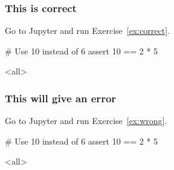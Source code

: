 \documentclass{beamerunicatt}
\begin{document}
\begin{frame}[fragile]
\frametitle{This is correct}
\begin{pyexercise}{Go to Jupyter and run Exercise~\ref{ex:correct}.}
\begin{pycell}
# Use 10 instead of 6
assert 10 == 2 * 5
\end{pycell}
\mode<all>
\label{ex:correct}
\end{pyexercise}
\end{frame}

\begin{frame}
\frametitle{This will give an error}
\begin{pyexercise}{Go to Jupyter and run Exercise~\ref{ex:wrong}.}
\begin{pycell}
# Use 10 instead of 6
assert 10 == 2 * 5
\end{pycell}
\mode<all>
\label{ex:wrong}
\end{pyexercise}
\end{frame}
\end{document}
